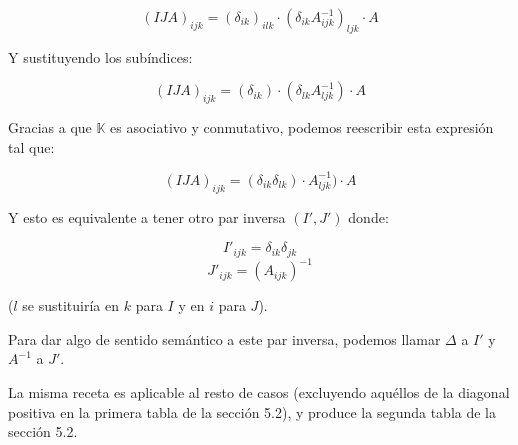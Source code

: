 $$(IJA)_{ijk} = (\delta_{ik})_{ilk} \cdot (\delta_{ik} A_{ijk}^{-1})_{ljk} \cdot A$$

Y sustituyendo los subíndices:

$$(IJA)_{ijk} = (\delta_{ik}) \cdot (\delta_{lk} A_{ljk}^{-1}) \cdot A$$

Gracias a que $\mathbb{K}$ es asociativo y conmutativo, podemos reescribir esta expresión tal que:

$$(IJA)_{ijk} = (\delta_{ik} \delta_{lk}) \cdot A_{ljk}^{-1}) \cdot A$$

Y esto es equivalente a tener otro par inversa $(I', J')$ donde:

$$I'_{ijk} = \delta_{ik} \delta_{jk}$$
$$J'_{ijk} = (A_{ijk})^{-1}$$

($l$ se sustituiría en $k$ para $I$ y en $i$ para $J$).

Para dar algo de sentido semántico a este par inversa, podemos llamar $\Delta$ a $I'$ y $A^{-1}$ a $J'$.

La misma receta es aplicable al resto de casos (excluyendo aquéllos de la diagonal positiva en la primera tabla de la sección 5.2), y produce la segunda tabla de la sección 5.2.
